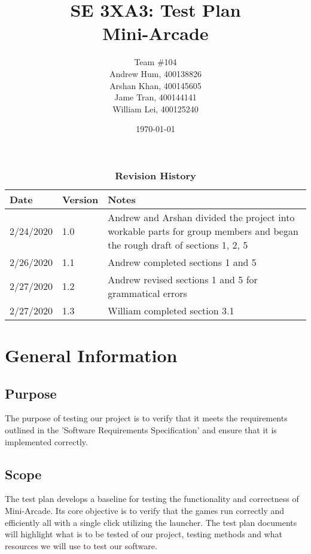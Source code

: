 \documentclass[12pt, titlepage]{article}
\title{SE 3XA3: Test Plan\\Mini-Arcade}
\author{Team \#104
		\\ Andrew Hum, 400138826
		\\ Arshan Khan, 400145605
		\\ Jame Tran, 400144141
		\\ William Lei, 400125240
}
\date{\today}
\begin{document}
\maketitle

\tableofcontents
\listoftables
\listoffigures

\begin{table}[hbp]
\caption{\bf Revision History}
\begin{tabularx}{\textwidth}{p{3cm}p{2cm}X}
\toprule {\bf Date} & {\bf Version} & {\bf Notes}\\
\midrule
2/24/2020 & 1.0 & Andrew and Arshan divided the project into workable parts for group members and began the rough draft of sections 1, 2, 5\\
2/26/2020 & 1.1 & Andrew completed sections 1 and 5\\
2/27/2020 & 1.2 & Andrew revised sections 1 and 5 for grammatical errors\\
2/27/2020 & 1.3 & William completed section 3.1\\
\bottomrule
\end{tabularx}
\end{table}

\newpage


\section{General Information}

\subsection{Purpose}

The purpose of testing our project is to verify that it meets the requirements outlined in the 'Software Requirements Specification' and ensure that it is implemented correctly.

\subsection{Scope}

The test plan develops a baseline for testing the functionality and correctness of Mini-Arcade. Its core objective is to verify that the games run correctly and efficiently all with a single click utilizing the launcher. The test plan documents will highlight what is to be tested of our project, testing methods and what resources we will use to test our software.
\end{document}
